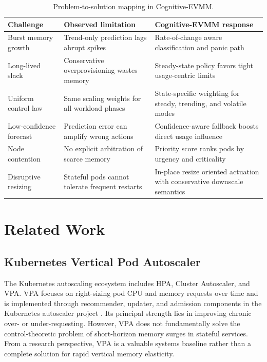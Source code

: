 \documentclass[12pt,a4paper]{article}
\begin{document}
\begin{table}[t]
\centering
\caption{Problem-to-solution mapping in Cognitive-EVMM.}
\label{tab:problem_mapping}
\begin{tabularx}{\textwidth}{L{3.2cm}L{4.7cm}Y}
\toprule
\textbf{Challenge} & \textbf{Observed limitation} & \textbf{Cognitive-EVMM response} \\
\midrule
Burst memory growth & Trend-only prediction lags abrupt spikes & Rate-of-change aware classification and panic path \\
Long-lived slack & Conservative overprovisioning wastes memory & Steady-state policy favors tight usage-centric limits \\
Uniform control law & Same scaling weights for all workload phases & State-specific weighting for steady, trending, and volatile modes \\
Low-confidence forecast & Prediction error can amplify wrong actions & Confidence-aware fallback boosts direct usage influence \\
Node contention & No explicit arbitration of scarce memory & Priority score ranks pods by urgency and criticality \\
Disruptive resizing & Stateful pods cannot tolerate frequent restarts & In-place resize oriented actuation with conservative downscale semantics \\
\bottomrule
\end{tabularx}
\end{table}

\section{Related Work}
\label{sec:related}

\subsection{Kubernetes Vertical Pod Autoscaler}

The Kubernetes autoscaling ecosystem includes HPA, Cluster Autoscaler, and VPA. VPA focuses on right-sizing pod CPU and memory requests over time and is implemented through recommender, updater, and admission components in the Kubernetes autoscaler project \cite{vpa-repo}. Its principal strength lies in improving chronic over- or under-requesting. However, VPA does not fundamentally solve the control-theoretic problem of short-horizon memory surges in stateful services. From a research perspective, VPA is a valuable systems baseline rather than a complete solution for rapid vertical memory elasticity.
\end{document}
